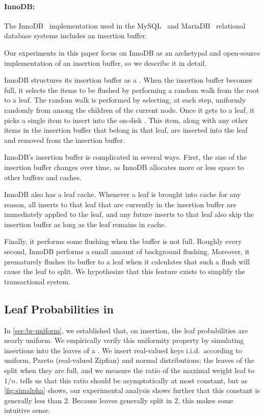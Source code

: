 \paragraph{InnoDB:}  The InnoDB~\cite{Oracle17a} \btree{} implementation used
in the MySQL~\cite{Oracle17b} and MariaDB~\cite{Foundation17} relational
database systems includes an insertion buffer.

Our experiments in this paper focus on InnoDB as an archetypal and open-source
implementation of an insertion buffer, so we describe it in detail.

InnoDB structures its insertion buffer as a \btree{}.  When the insertion
buffer becomes full, it selects the items to be flushed by performing a random
walk from the root to a leaf.  The random walk is performed by selecting, at
each step, uniformly randomly from among the children of the current node.
Once it gets to a leaf, it picks a single item to insert into the on-disk
\btree{}.  This item, along with any other items in the insertion buffer that
belong in that leaf, are inserted into the leaf and removed from the insertion
buffer.

InnoDB's insertion buffer is complicated in several ways.  First, the size of
the insertion buffer changes over time, as InnoDB allocates more or less space
to other buffers and caches.

InnoDB also has a leaf cache.  Whenever a leaf is brought into cache for any
reason, all inserts to that leaf that are currently in the insertion buffer are
immediately applied to the leaf, and any future inserts to that leaf also skip
the insertion buffer as long as the leaf remains in cache.

Finally, it performs some flushing when the buffer is not full. Roughly every
second, InnoDB performs a small amount of background flushing. Moreover, it
prematurely flushes its buffer to a leaf when it calculates that such a flush
will cause the leaf to split. We hypothesize that this feature exists to
simplify the transactional system.

\subsection{Leaf Probabilities in \btrees{}}\label{sec:br-exp-insertion}
In \cref{sec:br-uniform}, we established that, on insertion, the leaf
probabilities are nearly uniform.  We empirically verify this uniformity
property by simulating insertions into the leaves of a \btree{}. We insert
real-valued keys i.i.d.\ according to uniform, Pareto (real-valued Zipfian) and
normal distributions; the leaves of the \btree{} split when they are full, and
we measure the ratio of the maximal weight leaf to $1/n$.
 tells us that this ratio should be asymptotically at
most constant, but as \cref{fig:simalpha} shows, our experimental analysis
shows further that this constant is generally less than 2. Because leaves
generally split in 2, this makes some intuitive sense.


